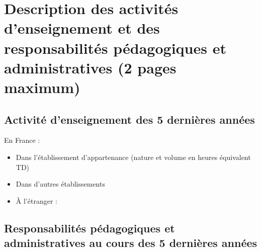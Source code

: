 \documentclass[a4paper,11pt]{article}
\newcommand{\anglaisFrancais}[2]{#2}
\newcommand{\anglaisFrancais}[2]{#1}
\newcommand{\instructionsNotice}[1]{{\color{gray}{#1}}}
\newcommand{\instructionsNotice}[1]{}
\begin{document}
\section{\anglaisFrancais{Description of teaching activities, educational and administrative responsibilities (maximum 2 pages)}{Description des activités d'enseignement et des responsabilités pédagogiques et administratives (2 pages maximum)}}

\instructionsNotice{
\begin{itemize}
	\item Des activités d’enseignement dans l’établissement d’appartenance (nombre annuel
d’heures en équivalent TD, matière, niveau), dans d’autres établissements et à
l’étranger ;
	\item Des responsabilités pédagogiques et administratives exercées au cours des cinq
dernières années.

\end{itemize}
}

\subsection*{\anglaisFrancais{Teaching activities during the last 5 years}{Activité d'enseignement des 5 dernières années}}



\anglaisFrancais{In France :}{En France :}

\begin{itemize}
\item \anglaisFrancais{Home institution (number of teaching hours – calculated as equivalent to 1 hour of practical tutorials)}
{Dans l’établissement d’appartenance (nature et volume en heures équivalent TD)}


\item \anglaisFrancais{In other institutions}{Dans d’autres établissements}


\item \anglaisFrancais{In other countries}{À l’étranger :}

\end{itemize}

\subsection*{\anglaisFrancais{Educational and administrative responsibilities during the last 5 years}{Responsabilités pédagogiques et administratives au cours des 5 dernières années}}
\end{document}
